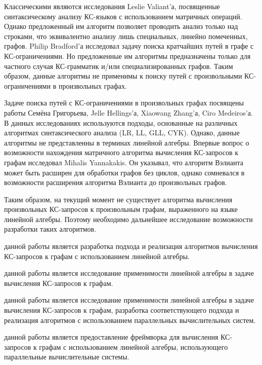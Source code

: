 Классическими являются исследования Leslie Valiant'а, посвященные синтаксическому анализу КС-языков с использованием матричных операций. Однако предложенный им алгоритм позволяет проводить анализ только над строками, что эквивалентно анализу лишь специальных, линейно помеченных, графов. Philip Bradford'а  исследовал задачу поиска кратчайших путей в графе с КС-ограничениями. Но предложенные им алгоритмы предназначены только для частного случая КС-грамматик и/или специализированных графов. Таким образом, данные алгоритмы не применимы к поиску путей с произвольными КС-ограничениями в произвольных графах.

Задаче поиска путей с КС-ограничениями в произвольных графах посвящены работы Семёна Григорьева, Jelle Hellings'а, Xiaowang Zhang'а, Ciro Medeiros'а. В данных исследованиях используются подходы, основанные на различных алгоритмах синтаксического анализа (LR, LL, GLL, CYK). Однако, данные алгоритмы не представленны в терминах линейной алгебры. Впервые вопрос о возможности нахождения матричного алгоритма вычисления КС-запросов к графам исследовал Mihalis Yannakakis. Он указывал, что алгоритм Вэлианта может быть расширен для обработки графов без циклов, однако сомневался в возможности расширения алгоритма Вэлианта до произвольных графов.

Таким образом, на текущий момент не существует алгоритма вычисления произвольных КС-запросов к произвольным графам, выраженного на языке линейной алгебры. Поэтому необходимо дальнейшее исследование возможности разработки таких алгоритмов.

{\aim} данной работы является разработка подхода и реализация алгоритмов вычисления КС-запросов к графам с использованием линейной алгебры.

{\aim} данной работы является исследование применимости линейной алгебры в задаче вычисления КС-запросов к графам.

{\aim} данной работы является исследование применимости линейной алгебры в задаче вычисления КС-запросов к графам, разработка соответствующего подхода и реализация алгоритмов с использованием параллельных вычислительных систем.

{\aim} данной работы является предоставление фреймворка для вычисления КС-запросов к графам с использованием линейной алгебры, использующего параллельные вычислительные системы.

